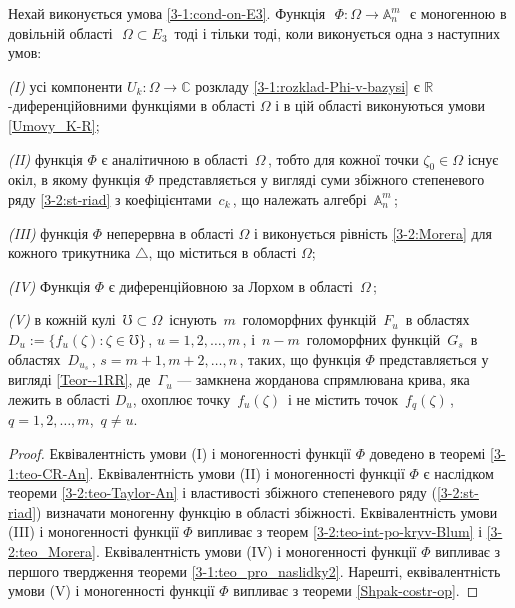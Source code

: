 \documentclass[11pt, reqno]{amsart}
\begin{document}
\begin{theorem} \label{3-2:eqv-opr-mon-fun}
Нехай виконується умова \eqref{3-1:cond-on-E3}.
Функція\,\, $\Phi : \Omega\rightarrow\mathbb{A}_n^m$\,\,  є моногенною в
довільній області\,\, $\Omega\subset E_3$\, тоді і тільки тоді, коли
виконується одна з наступних умов:

\emph{(I)} усі компоненти $U_k:\Omega\rightarrow\mathbb{C}$ розкладу \eqref{3-1:rozklad-Phi-v-bazysi}
є $\mathbb{R}$-диференційовними функціями в області $\Omega$ і в цій області виконуються умови
\eqref{Umovy_K-R};

\emph{(II)} функція $\Phi$ є аналітичною в області\,
$\Omega$\,, тобто
для кожної точки $\zeta_0\in \Omega$ існує окіл, в якому функція
$\Phi$ представляється   у вигляді суми збіжного степеневого ряду \eqref{3-2:st-riad}
з коефіцієнтами\, $c_k$\,,  що належать алгебрі\,
$\mathbb{A}_n^m$\,;

\emph{(III)} функція  $\Phi$ неперервна в області $\Omega$ і
виконується рівність \eqref{3-2:Morera}
для кожного трикутника $\triangle$, що міститься в області $\Omega$;


\emph{(IV)} Функція $\Phi$ є диференційовною за Лорхом в області\, $\Omega$\,;

\emph{(V)} в кожній кулі\, $\mho\subset\Omega$\,
існують\, $m$\, голоморфних функцій\, $F_u$\, в областях\, $D_u:=\{f_u(\zeta) : \zeta\in\mho\}$\,, $u=1,2,\dots,m$\,,
і\, $n-m$\, голоморфних функцій\, $G_s$\, в областях\, $D_{u_s}$\,, $s=m+1,m+2,\dots,n$\,, таких,
що функція $\Phi$ представляється у вигляді \eqref{Teor--1RR},
де\, $\Gamma_u$ --- замкнена жорданова спрямлювана крива, яка лежить в області $D_u$, охоплює  точку\,
$f_u(\zeta)$\, і не містить точок\, $f_q(\zeta)$\,, $q=1,2,\ldots, m$,\, $q\neq u$.
\end{theorem}

\begin{proof} 
Еквівалентність умови (I) і моногенності функції $\Phi$ доведено в теоремі \ref{3-1:teo-CR-An}.
Еквівалентність умови (II) і моногенності функції $\Phi$ є наслідком теореми
\ref{3-2:teo-Taylor-An} і властивості збіжного степеневого ряду
(\ref{3-2:st-riad}) визначати моногенну функцію в області збіжності.
Еквівалентність умови (III) і моногенності функції $\Phi$ випливає з теорем
\ref{3-2:teo-int-po-kryv-Blum} і \ref{3-2:teo_Morera}. Еквівалентність умови (IV) і моногенності функції
$\Phi$ випливає з першого твердження теореми \ref{3-1:teo_pro_naslidky2}. Нарешті,
еквівалентність умови (V) і моногенності функції $\Phi$ випливає з теореми
\ref{Shpak-costr-op}.
\end{proof}
\end{document}

